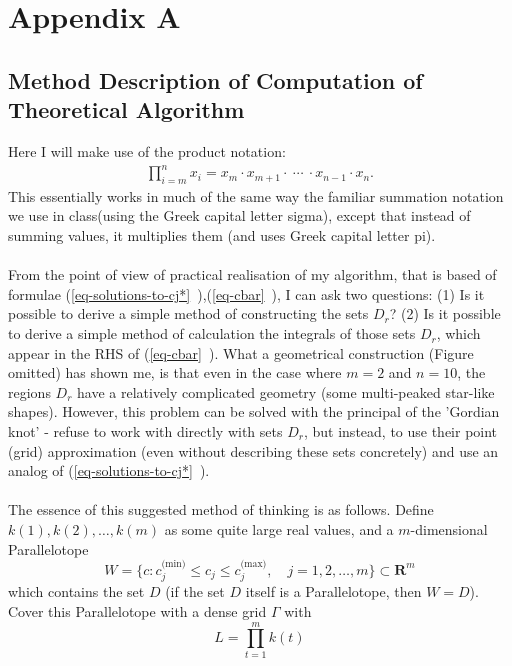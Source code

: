 \section{Appendix A} \label{apendix}
\subsection{Method Description of Computation of Theoretical Algorithm}

Here I will make use of the product notation:
\begin{gather*}
\prod\limits_{i = m}^{n} x_{i} = x_{m} \cdot x_{m+1} \cdot \  \cdots \  \cdot x_{n-1} \cdot x_{n}.
\end{gather*}
This essentially works in much of the same way the familiar summation notation we use in class(using the Greek capital letter sigma), except that instead of summing values, it multiplies them (and uses Greek capital letter pi). \cite{product_1995}\\
\\
From the point of view of practical realisation of my algorithm, that is based of formulae (\vref{eq-solutions-to-cj*}~),(\vref{eq-cbar}~), I can ask two questions: (1) Is it possible to derive a simple method of constructing the sets $D_{r}$? (2) Is it possible to derive a simple method of calculation the integrals of those sets $D_{r}$, which appear in the RHS of (\vref{eq-cbar}~). What a geometrical construction (Figure omitted) has shown me, is that even in the case where $m=2$ and $n=10$, the regions $D_{r}$ have a relatively complicated geometry (some multi-peaked star-like shapes). However, this problem can be solved with the principal of the 'Gordian knot' - refuse to work with directly with sets $D_{r}$, but instead, to use their point (grid) approximation (even without describing these sets concretely) and use an analog of (\vref{eq-solutions-to-cj*}~).\\
\\
The essence of this suggested method of thinking is as follows. Define $k(1),k(2),\dots,k(m)$ as some quite large real values, and a $m$-dimensional Parallelotope
\begin{equation}
W=\{ c:c_{j}^{(\text{min)}} \leq c_{j} \leq c_{j}^{(\text{max)}}, \quad j=1,2,\dots,m \}\subset \boldsymbol{R}^{m}
\end{equation}
which contains the set $D$ (if the set $D$ itself is a Parallelotope, then $W=D$). Cover this Parallelotope with a dense grid $\Gamma$ with
\begin{equation}
L = \prod\limits_{t=1}^{m}k(t)
\end{equation}
